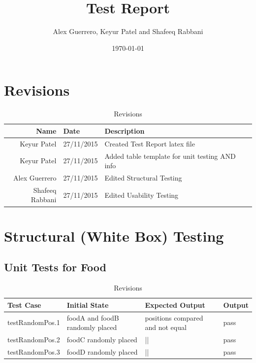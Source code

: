 \documentclass[12pt]{article}
\begin{document}
\title{Test Report} 
\author{Alex Guerrero, Keyur Patel and Shafeeq Rabbani}
\date{\today}

\maketitle

\section{Revisions}
\begin{center}
	\begin{longtable}{ | r | p{4cm} | p{4cm} | p{4cm} |}
	\caption{Revisions} \\ \hline \label{TblInputVar} 
	Name & Date & Description\\ \hline
	Keyur Patel & 27/11/2015 &  Created Test Report latex file\\ \hline

	Keyur Patel & 27/11/2015 &  Added table template for unit testing AND info\\ \hline

	Alex Guerrero & 27/11/2015 & Edited Structural Testing\\ \hline
	
		Shafeeq Rabbani & 27/11/2015 & Edited Usability Testing\\ \hline
	\end{longtable}
\end{center}

\section{Structural (White Box) Testing}

\subsection{Unit Tests for Food}

\begin{center}
	\begin{longtable}{ | p{3cm} | p{4cm} | p{4cm} | p{2cm} |}
	\caption{Revisions} \\ \hline \label{TblInputVar} 
	Test Case & Initial State & Expected Output & Output\\ \hline
	testRandomPos.1 & foodA and foodB randomly placed & positions compared and not equal & pass  \\ \hline
	testRandomPos.2 & foodC randomly placed & || & pass  \\ \hline
	testRandomPos.3 & foodD randomly placed & || & pass  \\ \hline

	\end{longtable}
\end{center}
\end{document}
